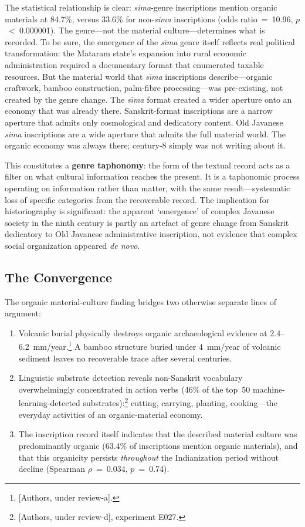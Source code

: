 \documentclass[12pt,a4paper]{article}
\begin{document}
The statistical relationship is clear: \emph{sima}-genre inscriptions mention organic materials at 84.7\%, versus 33.6\% for non-\emph{sima} inscriptions (odds ratio~=~10.96, $p$~<~0.000001). The genre---not the material culture---determines what is recorded. To be sure, the emergence of the \emph{s\={\i}ma} genre itself reflects real political transformation: the Mataram state's expansion into rural economic administration required a documentary format that enumerated taxable resources. But the material world that \emph{s\={\i}ma} inscriptions describe---organic craftwork, bamboo construction, palm-fibre processing---was pre-existing, not created by the genre change. The \emph{s\={\i}ma} format created a wider aperture onto an economy that was already there. Sanskrit-format inscriptions are a narrow aperture that admits only cosmological and dedicatory content. Old Javanese \emph{sima} inscriptions are a wide aperture that admits the full material world. The organic economy was always there; century-8 simply was not writing about it.

This constitutes a \textbf{genre taphonomy}: the form of the textual record acts as a filter on what cultural information reaches the present. It is a taphonomic process operating on information rather than matter, with the same result---systematic loss of specific categories from the recoverable record. The implication for historiography is significant: the apparent `emergence' of complex Javanese society in the ninth century is partly an artefact of genre change from Sanskrit dedicatory to Old Javanese administrative inscription, not evidence that complex social organization appeared \emph{de novo}.

\subsection{The Convergence}

The organic material-culture finding bridges two otherwise separate lines of argument:

\begin{enumerate}
\item Volcanic burial physically destroys organic archaeological evidence at 2.4--6.2~mm/year.\footnote{[Authors, under review-a].} A bamboo structure buried under 4~mm/year of volcanic sediment leaves no recoverable trace after several centuries.

\item Linguistic substrate detection reveals non-Sanskrit vocabulary overwhelmingly concentrated in action verbs (46\% of the top~50 machine-learning-detected substrates):\footnote{[Authors, under review-d], experiment E027.} cutting, carrying, planting, cooking---the everyday activities of an organic-material economy.

\item The inscription record itself indicates that the described material culture was predominantly organic (63.4\% of inscriptions mention organic materials), and that this organicity persists \emph{throughout} the Indianization period without decline (Spearman $\rho$~=~0.034, $p$~=~0.74).
\end{enumerate}
\end{document}
